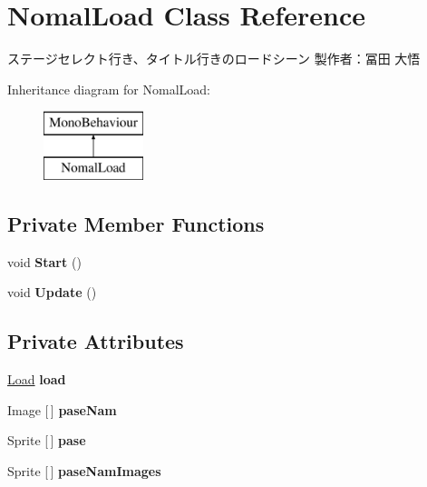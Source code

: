 \hypertarget{class_nomal_load}{}\section{Nomal\+Load Class Reference}
\label{class_nomal_load}


ステージセレクト行き、タイトル行きのロードシーン 製作者：冨田 大悟  


Inheritance diagram for Nomal\+Load\+:\begin{figure}[H]
\begin{center}
\leavevmode
\includegraphics[height=2.000000cm]{class_nomal_load}
\end{center}
\end{figure}
\subsection*{Private Member Functions}
\begin{DoxyCompactItemize}
\item 
\mbox{\label{class_nomal_load_af3360009321e2d10f7bbde1ad262f5ae}} 
void {\bfseries Start} ()
\item 
\mbox{\label{class_nomal_load_a174f115e9440a7847bff189e643d4293}} 
void {\bfseries Update} ()
\end{DoxyCompactItemize}
\subsection*{Private Attributes}
\begin{DoxyCompactItemize}
\item 
\mbox{\label{class_nomal_load_ab9ec5560ea8bd02a272dd2483be38323}} 
\hyperlink{class_load}{Load} {\bfseries load}
\item 
\mbox{\label{class_nomal_load_ad26e4aaffaeeb03b99d103c41dc8567a}} 
Image \mbox{[}$\,$\mbox{]} {\bfseries pase\+Nam}
\item 
\mbox{\label{class_nomal_load_a251cdd9ba0aea981704bfd6dc47f48b3}} 
Sprite \mbox{[}$\,$\mbox{]} {\bfseries pase}
\item 
\mbox{\label{class_nomal_load_ada6d75d3d99e19418c95e50b34324d7d}} 
Sprite \mbox{[}$\,$\mbox{]} {\bfseries pase\+Nam\+Images}
\end{DoxyCompactItemize}


